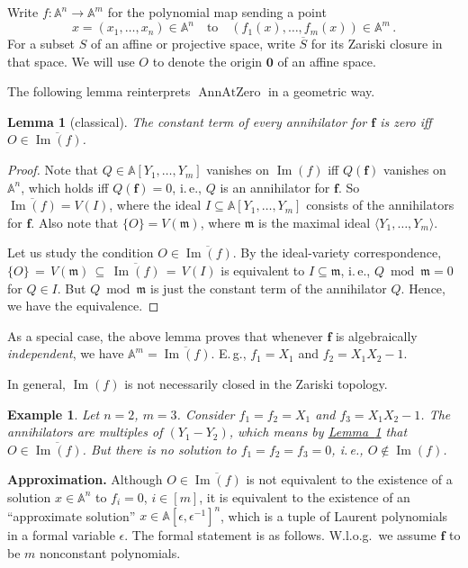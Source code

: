 \documentclass[11pt]{article}
\numberwithin{equation}{section}
\newtheorem{lemma}[theorem]{Lemma}
\theoremstyle{definition}
\theoremstyle{plain}
\newcommand{\ie}{i.\,e.}
\newcommand{\Eg}{E.\,g.}
\newcommand{\expref}[2]{\hyperref[#2]{#1~\ref{#2}}}
\newtheorem{exmp}{Example}
\newcommand{\aff}{\mathbb{A}}
\DeclareMathOperator{\im}{\mathrm{Im}}
\newcommand{\ol}[1]{\overline{#1}}
\newcommand{\m}{\mathfrak{m}}
\DeclareMathOperator{\AnnAtZero}{\mathrm{AnnAtZero}\xspace} %
\begin{document}
Write $f:\aff^n\to \aff^m$ for the polynomial map sending a point
\[
  x=(x_1,\dots,x_n)\in \aff^n\quad\text{to}\quad (f_1(x),\dots,f_m(x))\in \aff^m\,.
  \]
  For a subset $S$ of an affine or projective space, write
  $\overline{S}$ for its Zariski closure in that space. We will use
  $O$ to denote the origin $\mathbf 0$ of an affine space.

%
 
The following lemma reinterprets $\AnnAtZero$ in a geometric way.
 \begin{lemma}[classical]\label{lem_geom}
 The constant term of every annihilator for $\mathbf f$ is zero iff $O\in \overline{\im(f)}$. %
 \end{lemma}
 \begin{proof}
 Note that %
 $Q\in \aff[Y_1,\dots,Y_m]$ vanishes on $\im(f)$ iff $Q(\mathbf f)$ vanishes on $\aff^n$, which holds iff $Q(\mathbf f)=0$, \ie, $Q$ is an annihilator for $\mathbf f$. So $\overline{\im(f)}=V(I)$, where the ideal $I\subseteq \aff[Y_1,\dots,Y_m]$ consists of the annihilators for $\mathbf f$. Also note that $\{O\}=V(\m)$, where $\m$ is the maximal ideal $\langle Y_1,\dots, Y_m\rangle$.

Let us study the condition $O\in \overline{\im(f)}$.
 By the ideal-variety correspondence, $\{O\} \,=\, V(\m) \,\subseteq\, \overline{\im(f)} \,=\, V(I)$ is equivalent to $I\subseteq \m$, \ie,  $Q\bmod \m=0$ for  $Q\in I$. But $Q\bmod \m$ is just the constant term of the annihilator $Q$. Hence, we have the equivalence.
 \end{proof}
 
%
%
As a special case,
%
the above lemma proves that
whenever $\mathbf f$
%
is  %
algebraically \emph{independent}, we have $\aff^m=\ol{\im(f)}$. \Eg, $f_1=X_1$ and $f_2=X_1 X_2-1$. 
%

In general, %
$\im(f)$ is not necessarily closed in the Zariski topology. 
\begin{exmp}\label{exmp_closure}
Let $n=2$, $m=3$. Consider $f_1=f_2=X_1$ and $f_3=X_1 X_2-1$. The annihilators are multiples of $(Y_1-Y_2)$, which means by \expref{Lemma}{lem_geom} that $O\in \ol{\im(f)}$. But there is no solution to $f_1=f_2=f_3=0$, \ie, $O\notin \im(f)$.
\end{exmp}

\noindent
\textbf{Approximation.} Although $O\in \overline{\im(f)}$ is not equivalent to the existence of a solution $x\in \aff^n$ to $f_i=0$, $i\in[m]$, it is equivalent to the existence of an  ``approximate solution'' $x\in \aff[\epsilon,\epsilon^{-1}]^n$, which is a tuple of Laurent polynomials in a formal variable $\epsilon$. The formal statement is as follows. W.l.o.g.\ we assume $\mathbf f$ to be $m$ nonconstant polynomials.
\end{document}
